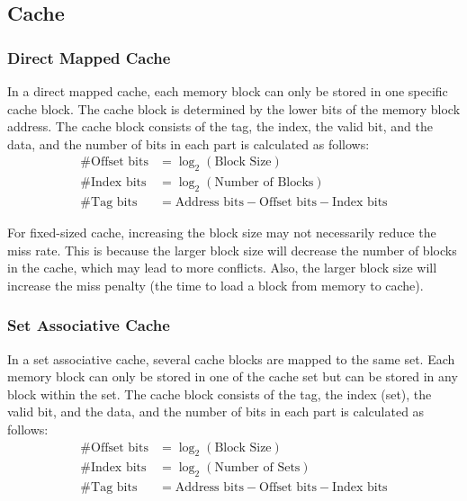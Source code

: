 \documentclass[a4paper,12pt]{article}
\begin{document}
\subsection{Cache}

\subsubsection{Direct Mapped Cache}

In a direct mapped cache, each memory block can only be stored in one specific cache block. The cache block is determined by the lower bits of the memory block address. The cache block consists of the tag, the index, the valid bit, and the data, and the number of bits in each part is calculated as follows:
\begin{align*}
	\#\text{Offset bits} &= \log_2(\text{Block Size}) \\
	\#\text{Index bits} &= \log_2(\text{Number of Blocks}) \\
	\#\text{Tag bits} &= \text{Address bits} - \text{Offset bits} - \text{Index bits}
\end{align*}

\begin{warningbox}
	For fixed-sized cache, increasing the block size may not necessarily reduce the miss rate. This is because the larger block size will decrease the number of blocks in the cache, which may lead to more conflicts. Also, the larger block size will increase the miss penalty (the time to load a block from memory to cache).
\end{warningbox}

\subsubsection{Set Associative Cache}

In a set associative cache, several cache blocks are mapped to the same set. Each memory block can only be stored in one of the cache set but can be stored in any block within the set. The cache block consists of the tag, the index (set), the valid bit, and the data, and the number of bits in each part is calculated as follows:
\begin{align*}
	\#\text{Offset bits} &= \log_2(\text{Block Size}) \\
	\#\text{Index bits} &= \log_2(\text{Number of Sets}) \\
	\#\text{Tag bits} &= \text{Address bits} - \text{Offset bits} - \text{Index bits}
\end{align*}
\end{document}
